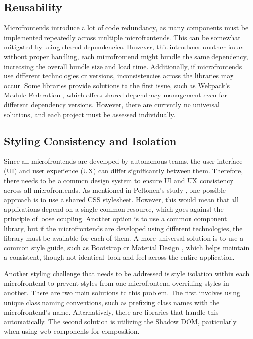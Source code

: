 \subsection{Reusability}
Microfrontends introduce a lot of code redundancy, as many components must be implemented repeatedly across multiple microfrontends. This can be somewhat mitigated by using shared dependencies. However, this introduces another issue: without proper handling, each microfrontend might bundle the same dependency, increasing the overall bundle size and load time. Additionally, if microfrontends use different technologies or versions, inconsistencies across the libraries may occur. Some libraries provide solutions to the first issue, such as Webpack's Module Federation \cite{ModuleFederation}, which offers shared dependency management even for different dependency versions. However, there are currently no universal solutions, and each project must be assessed individually.

\subsection{Styling Consistency and Isolation}
Since all microfrontends are developed by autonomous teams, the user interface (UI) and user experience (UX) can differ significantly between them. Therefore, there needs to be a common design system to ensure UI and UX consistency across all microfrontends. As mentioned in Peltonen's study \cite{Peltonen}, one possible approach is to use a shared CSS stylesheet. However, this would mean that all applications depend on a single common resource, which goes against the principle of loose coupling. Another option is to use a common component library, but if the microfrontends are developed using different technologies, the library must be available for each of them. A more universal solution is to use a common style guide, such as Bootstrap \cite{Bootstrap} or Material Design \cite{MaterialDesign}, which helps maintain a consistent, though not identical, look and feel across the entire application.

Another styling challenge that needs to be addressed is style isolation within each microfrontend to prevent styles from one microfrontend overriding styles in another. There are two main solutions to this problem. The first involves using unique class naming conventions, such as prefixing class names with the microfrontend's name. Alternatively, there are libraries that handle this automatically. The second solution is utilizing the Shadow DOM, particularly when using web components for composition.


